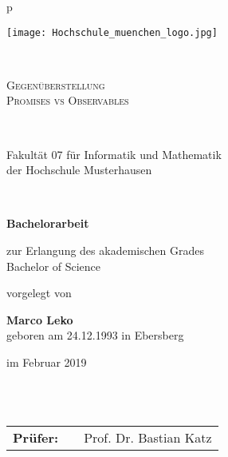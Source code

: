\begin{titlepage}
\begin{center}
\begin{tabular}{p{\textwidth}}


\begin{center}
\texttt{[image: Hochschule\_muenchen\_logo.jpg]}
\end{center}


\\

\begin{center}
\LARGE{\textsc{Gegenüberstellung \\
Promises vs Observables
}}
\end{center}

\\


\begin{center}
\large{Fakultät 07 für Informatik und Mathematik\\
der Hochschule Musterhausen \\}
\end{center}

\\

\begin{center}
\textbf{\Large{Bachelorarbeit}}
\end{center}


\begin{center}
zur Erlangung des akademischen Grades\\
Bachelor of Science
\end{center}


\begin{center}
vorgelegt von
\end{center}

\begin{center}
\large{\textbf{Marco Leko}} \\
\small{geboren am 24.12.1993 in Ebersberg}
\end{center}

\begin{center}
\large{im Februar 2019}
\end{center}

\\

\\

\begin{center}
\begin{tabular}{lll}
\textbf{Prüfer:} & & Prof. Dr. Bastian Katz\\
\end{tabular}
\end{center}

\end{tabular}
\end{center}
\end{titlepage}